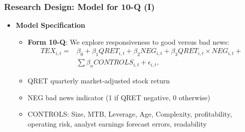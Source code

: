 \documentclass{beamer}
\begin{document}
\begin{frame}
\frametitle{Research Design: Model for 10-Q (I)}
\begin{itemize}
	
	\item \textbf{Model Specification}
	\begin{itemize}
		\item \textbf{Form 10-Q}: We explore  responsiveness to good versus bad news: 
		\begin{equation}
		\begin{aligned} 
		\label{eq1}
		TEX_{i,t}=
		&\beta_0+\beta_1QRET_{i,t}+\beta_2NEG_{i,t}+\beta_3QRET_{i,t}\times NEG_{i,t}+\\
		&\sum\beta_nCONTROLS_{i,t}+\epsilon_{i,t},
		\end{aligned} 
		\end{equation}
		
		
		
		\item QRET quarterly market-adjusted stock return
		\item NEG bad news indicator (1 if QRET negative, 0 otherwise)
		\item CONTROLS: Size, MTB, Leverage, Age, Complexity, profitability, operating risk, analyst earnings forecast errors, readability 
	\end{itemize}
\end{itemize}
\end{frame}
\end{document}
